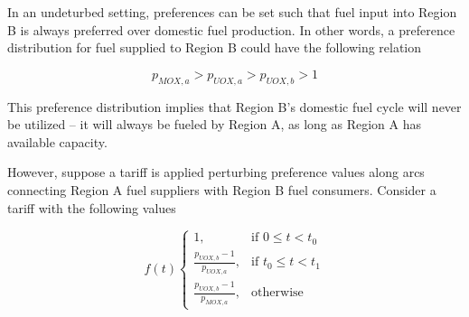 In an undeturbed setting, preferences can be set such that fuel input into
Region B is always preferred over domestic fuel production. In other words, a
preference distribution for fuel supplied to Region B could have the following
relation

\begin{equation}
  p_{MOX, a} > p_{UOX, a} > p_{UOX, b} > 1
\end{equation}

This preference distribution implies that Region B's domestic fuel cycle will
never be utilized -- it will always be fueled by Region A, as long as Region A
has available capacity.

However, suppose a tariff is applied perturbing preference values along arcs
connecting Region A fuel suppliers with Region B fuel consumers. Consider a
tariff with the following values

\begin{equation}
f(t)
\begin{cases}
1, & \text{if } 0 \leq t < t_0 \\
\frac{p_{UOX, b} - 1}{p_{UOX, a}}, & \text{if } t_0 \leq t < t_1 \\
\frac{p_{UOX, b} - 1}{p_{MOX, a}}, & \text{otherwise}
\end{cases} 
\end{equation}




